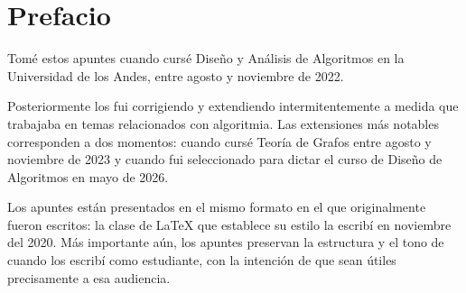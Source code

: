 \part*{Prefacio}

Tomé estos apuntes cuando cursé Diseño y Análisis de Algoritmos en la Universidad de los Andes, entre agosto y noviembre de 2022. 

Posteriormente los fui corrigiendo y extendiendo intermitentemente a medida que trabajaba en temas relacionados con algoritmia. Las extensiones más notables corresponden a dos momentos: cuando cursé Teoría de Grafos entre agosto y noviembre de 2023 y cuando fui seleccionado para dictar el curso de Diseño de Algoritmos en mayo de 2026.

Los apuntes están presentados en el mismo formato en el que originalmente fueron escritos: la clase de \LaTeX{} que establece su estilo la escribí en noviembre del 2020. Más importante aún, los apuntes preservan la estructura y el tono de cuando los escribí como estudiante, con la intención de que sean útiles precisamente a esa audiencia.


